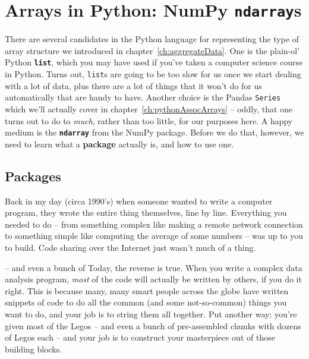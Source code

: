 


\chapter{Arrays in Python: NumPy \texttt{ndarray}s}

There are several candidates in the Python language for representing the type
of array structure we introduced in chapter~\ref{ch:aggregateData}. One is the
plain-ol' Python \textbf{\texttt{list}}, which you may have used if you've
taken a computer science course in Python. Turns out, \texttt{list}s are going
to be too slow for us once we start dealing with a lot of data, plus there are
a lot of things that it won't do for us automatically that are handy to have.
Another choice is the Pandas \texttt{Series} which we'll actually cover in
chapter~\ref{ch:pythonAssocArrays} -- oddly, that one turns out to do to
\textit{much}, rather than too little, for our purposes here. A happy medium is
the \textbf{\texttt{ndarray}} from the NumPy package. Before we do that,
however, we need to learn what a \textbf{package} actually is, and how to use
one.

\section{Packages}

Back in my day (circa 1990's) when someone wanted to write a computer program,
they wrote the entire thing themselves, line by line. Everything you needed to
do -- from something complex like making a remote network connection to
something simple like computing the average of some numbers -- was up to you to
build. Code sharing over the Internet just wasn't much of a thing.

 -- and even a bunch of
Today, the reverse is true. When you write a complex data analysis program,
\textit{most} of the code will actually be written by others, if you do it
right. This is because many, many smart people across the globe have written
snippets of code to do all the common (and some not-so-common) things you want
to do, and your job is to string them all together. Put another way: you're
given most of the Legos\textsuperscript{\textregistered} -- and even a bunch of
pre-assembled chunks with dozens of Legos\textsuperscript{\textregistered} each
-- and your job is to construct your masterpiece out of those building blocks.

